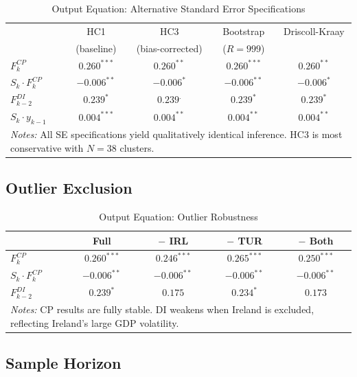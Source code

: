 \documentclass[12pt, a4paper]{article}
\begin{document}
\begin{table}[htbp]
\centering
\caption{Output Equation: Alternative Standard Error Specifications}
\label{tab:se_robust}
\small
\begin{tabular}{lcccc}
\toprule
 & HC1 & HC3 & Bootstrap & Driscoll-Kraay \\
 & (baseline) & (bias-corrected) & ($R = 999$) & \\
\midrule
$F_k^{CP}$            & $0.260^{***}$ & $0.260^{**}$ & $0.260^{***}$ & $0.260^{**}$ \\
$S_k \cdot F_k^{CP}$  & $-0.006^{**}$ & $-0.006^{*}$ & $-0.006^{**}$ & $-0.006^{*}$ \\
$F_{k-2}^{DI}$        & $0.239^{*}$   & $0.239^{.}$  & $0.239^{*}$   & $0.239^{*}$  \\
$S_k \cdot y_{k-1}$   & $0.004^{***}$ & $0.004^{**}$ & $0.004^{**}$  & $0.004^{**}$ \\
\bottomrule
\multicolumn{5}{p{12cm}}{\footnotesize \textit{Notes:} All SE specifications yield qualitatively identical inference. HC3 is most conservative with $N = 38$ clusters.} \\
\end{tabular}
\end{table}


\subsection{Outlier Exclusion}

\begin{table}[htbp]
\centering
\caption{Output Equation: Outlier Robustness}
\label{tab:outliers}
\small
\begin{tabular}{lcccc}
\toprule
 & Full & $-$ IRL & $-$ TUR & $-$ Both \\
\midrule
$F_k^{CP}$           & $0.260^{***}$ & $0.246^{***}$ & $0.265^{***}$ & $0.250^{***}$ \\
$S_k \cdot F_k^{CP}$ & $-0.006^{**}$ & $-0.006^{**}$ & $-0.006^{**}$ & $-0.006^{**}$ \\
$F_{k-2}^{DI}$       & $0.239^{*}$   & $0.175$       & $0.234^{*}$   & $0.173$       \\
\bottomrule
\multicolumn{5}{p{11cm}}{\footnotesize \textit{Notes:} CP results are fully stable. DI weakens when Ireland is excluded, reflecting Ireland's large GDP volatility.} \\
\end{tabular}
\end{table}


\subsection{Sample Horizon}
\end{document}
